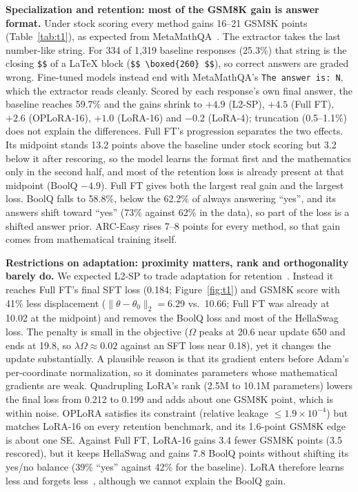 \documentclass{article}
\begin{document}
\textbf{Specialization and retention: most of the GSM8K gain is answer format.} Under stock scoring every method gains 16--21 GSM8K points (Table~\ref{tab:t1}), as expected from MetaMathQA~\cite{yu2024metamath}. The extractor takes the last number-like string. For 334 of 1,319 baseline responses (25.3\%) that string is the closing \texttt{\$\$} of a LaTeX block (\texttt{\$\$ \textbackslash boxed\{260\} \$\$}), so correct answers are graded wrong. Fine-tuned models instead end with MetaMathQA's \texttt{The answer is: N}, which the extractor reads cleanly. Scored by each response's own final answer, the baseline reaches 59.7\% and the gains shrink to $+4.9$ (L2-SP), $+4.5$ (Full FT), $+2.6$ (OPLoRA-16), $+1.0$ (LoRA-16) and $-0.2$ (LoRA-4); truncation (0.5--1.1\%) does not explain the differences. Full FT's progression separates the two effects. Its midpoint stands 13.2 points above the baseline under stock scoring but 3.2 below it after rescoring, so the model learns the format first and the mathematics only in the second half, and most of the retention loss is already present at that midpoint (BoolQ $-4.9$). Full FT gives both the largest real gain and the largest loss. BoolQ falls to 58.8\%, below the 62.2\% of always answering ``yes'', and its answers shift toward ``yes'' (73\% against 62\% in the data), so part of the loss is a shifted answer prior. ARC-Easy rises 7--8 points for every method, so that gain comes from mathematical training itself.

\textbf{Restrictions on adaptation: proximity matters, rank and orthogonality barely do.} We expected L2-SP to trade adaptation for retention~\cite{li2018l2sp}. Instead it reaches Full FT's final SFT loss (0.184; Figure~\ref{fig:t1}) and GSM8K score with 41\% less displacement ($\|\theta-\theta_0\|_2=6.29$ vs.\ 10.66; Full FT was already at 10.02 at the midpoint) and removes the BoolQ loss and most of the HellaSwag loss. The penalty is small in the objective ($\Omega$ peaks at 20.6 near update 650 and ends at 19.8, so $\lambda\Omega\approx0.02$ against an SFT loss near 0.18), yet it changes the update substantially. A plausible reason is that its gradient enters before Adam's per-coordinate normalization, so it dominates parameters whose mathematical gradients are weak. Quadrupling LoRA's rank (2.5M to 10.1M parameters) lowers the final loss from 0.212 to 0.199 and adds about one GSM8K point, which is within noise. OPLoRA satisfies its constraint (relative leakage $\le1.9\times10^{-4}$) but matches LoRA-16 on every retention benchmark, and its 1.6-point GSM8K edge is about one SE. Against Full FT, LoRA-16 gains 3.4 fewer GSM8K points (3.5 rescored), but it keeps HellaSwag and gains 7.8 BoolQ points without shifting its yes/no balance (39\% ``yes'' against 42\% for the baseline). LoRA therefore learns less and forgets less~\cite{biderman2024lora}, although we cannot explain the BoolQ gain.
\end{document}
